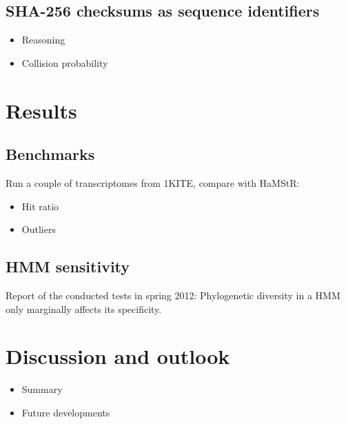 \documentclass[a4paper]{scrartcl}
\begin{document}
\subsection{SHA-256 checksums as sequence identifiers}

\begin{itemize}
	\item Reasoning
	\item Collision probability
\end{itemize}

\clearpage

\section{Results}

\subsection{Benchmarks}

Run a couple of transcriptomes from 1KITE, compare with HaMStR:

\begin{itemize}
	\item Hit ratio
	\item Outliers
\end{itemize}

\subsection{HMM sensitivity}

Report of the conducted tests in spring 2012: Phylogenetic diversity in a HMM only marginally affects its specificity.

\section{Discussion and outlook}

\begin{itemize}
	\item Summary
	\item Future developments
\end{itemize}
\end{document}
